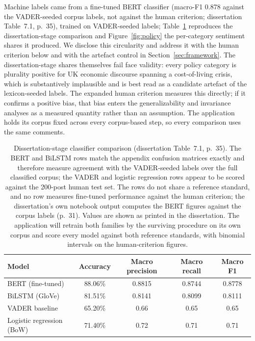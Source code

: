 Machine labels came from a fine-tuned BERT classifier (macro-F1 0.878 against the VADER-seeded corpus labels, not against the human criterion; dissertation Table~7.1, p.~35), trained on VADER-seeded labels; Table~\ref{tab:models} reproduces the dissertation-stage comparison and Figure~\ref{fig:policy} the per-category sentiment shares it produced. We disclose this circularity and address it with the human criterion below and with the artefact control in Section~\ref{sec:framework}. The dissertation-stage shares themselves fail face validity: every policy category is plurality positive for UK economic discourse spanning a cost-of-living crisis, which is substantively implausible and is best read as a candidate artefact of the lexicon-seeded labels. The expanded human criterion measures this directly; if it confirms a positive bias, that bias enters the generalizability and invariance analyses as a measured quantity rather than an assumption. The application holds its corpus fixed across every corpus-based step, so every comparison uses the same comments.

\begin{table}[t]
\centering
\caption{Dissertation-stage classifier comparison (dissertation Table~7.1, p.~35). The BERT and BiLSTM rows match the appendix confusion matrices exactly and therefore measure agreement with the VADER-seeded labels over the full classified corpus; the VADER and logistic regression rows appear to be scored against the 200-post human test set. The rows do not share a reference standard, and no row measures fine-tuned performance against the human criterion; the dissertation's own notebook output computes the BERT figures against the corpus labels (p.~31). Values are shown as printed in the dissertation. The application will retrain both families by the surviving procedure on its own corpus and score every model against both reference standards, with binomial intervals on the human-criterion figures.}
\label{tab:models}
\begin{tabular}{lcccc}
\toprule
Model & Accuracy & Macro precision & Macro recall & Macro F1 \\
\midrule
BERT (fine-tuned) & 88.06\% & 0.8815 & 0.8744 & 0.8778 \\
BiLSTM (GloVe) & 81.51\% & 0.8141 & 0.8099 & 0.8111 \\
VADER baseline & 65.20\% & 0.66 & 0.65 & 0.65 \\
Logistic regression (BoW) & 71.40\% & 0.72 & 0.71 & 0.71 \\
\bottomrule
\end{tabular}
\end{table}

